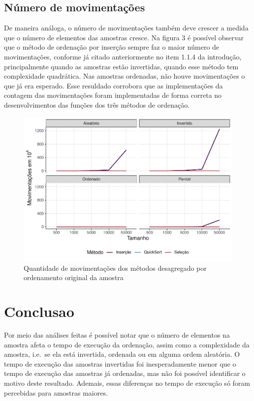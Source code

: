 \documentclass[
]{article}
\begin{document}
\break

\hypertarget{nuxfamero-de-movimentauxe7uxf5es}{%
\subsection{Número de
movimentações}\label{nuxfamero-de-movimentauxe7uxf5es}}

De maneira análoga, o número de movimentações também deve crescer a
medida que o número de elementos das amostras cresce. Na figura 3 é
possível observar que o método de ordenação por inserção sempre faz o
maior número de movimentações, conforme já citado anteriormente no item
1.1.4 da introdução, principalmente quando as amostras estão invertidas,
quando esse método tem complexidade quadrática. Nas amostras ordenadas,
não houve movimentações o que já era esperado. Esse resuldado corrobora
que as implementações da contagem das movimentações foram implementadas
de forma correta no desenvolvimentos das funções dos três métodos de
ordenação.

\begin{figure}

{\centering \includegraphics[width=0.75\linewidth]{relatorio_tp1_files/figure-latex/grafico-movimentacoes-1} 

}

\caption{Quantidade de movimentações dos métodos desagregado por ordenamento original da amostra}\label{fig:grafico-movimentacoes}
\end{figure}

\hypertarget{conclusao}{%
\section{Conclusao}\label{conclusao}}

Por meio das análises feitas é possível notar que o número de elementos
na amostra afeta o tempo de execução da ordenação, assim como a
complexidade da amostra, i.e.~se ela está invertida, ordenada ou em
alguma ordem aleatória. O tempo de execução das amostras invertidas foi
inesperadamente menor que o tempo de execução das amostras já ordenadas,
mas não foi possível identificar o motivo deste resultado. Ademais,
essas diferenças no tempo de execução só foram percebidas para amostras
maiores.
\end{document}
